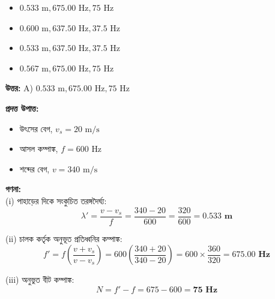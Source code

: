 \documentclass[12pt, a4paper]{article}
\begin{document}
\begin{itemize}[label={}, leftmargin=1cm, itemsep=0.5em]
    \item[\textbf{A)}] $0.533\text{ m}, 675.00\text{ Hz}, 75\text{ Hz}$
    \item[\textbf{B)}] $0.600\text{ m}, 637.50\text{ Hz}, 37.5\text{ Hz}$
    \item[\textbf{C)}] $0.533\text{ m}, 637.50\text{ Hz}, 37.5\text{ Hz}$
    \item[\textbf{D)}] $0.567\text{ m}, 675.00\text{ Hz}, 75\text{ Hz}$
\end{itemize}

\vspace{0.5em}
\begin{tcolorbox}[answerbox]
    \textbf{\color{success} উত্তর:} A) $0.533\text{ m}, 675.00\text{ Hz}, 75\text{ Hz}$
\end{tcolorbox}
\vspace{1em}

\begin{tcolorbox}[solutionbox={সমাধান (Solution)}]
    \noindent
    \textbf{প্রদত্ত উপাত্ত:}
    \begin{itemize}[leftmargin=1.5em, itemsep=0.2em]
        \item উৎসের বেগ, $v_s = 20\text{ m/s}$
        \item আসল কম্পাঙ্ক, $f = 600\text{ Hz}$
        \item শব্দের বেগ, $v = 340\text{ m/s}$
    \end{itemize}

    \vspace{0.6em}
    \noindent\textbf{গণনা:} \\
    (i) পাহাড়ের দিকে সংকুচিত তরঙ্গদৈর্ঘ্য:
    \[ \lambda' = \frac{v - v_s}{f} = \frac{340 - 20}{600} = \frac{320}{600} = \mathbf{0.533\text{ m}} \]
    
    (ii) চালক কর্তৃক অনুভূত প্রতিধ্বনির কম্পাঙ্ক:
    \[ f' = f \left(\frac{v + v_s}{v - v_s}\right) = 600 \left(\frac{340 + 20}{340 - 20}\right) = 600 \times \frac{360}{320} = \mathbf{675.00\text{ Hz}} \]
    
    (iii) অনুভুত বীট কম্পাঙ্ক:
    \[ N = f' - f = 675 - 600 = \mathbf{75\text{ Hz}} \]
\end{tcolorbox}
\end{document}
